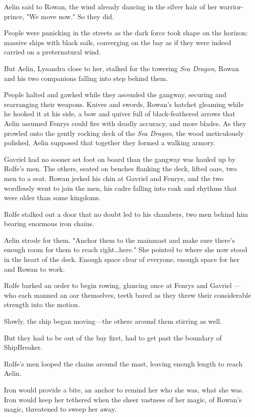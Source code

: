 Aelin said to Rowan, the wind already dancing in the silver hair of her warrior-prince, "We move now."
So they did.

People were panicking in the streets as the dark force took shape on the horizon: massive ships with black sails, converging on the bay as if they were indeed carried on a preternatural wind.

But Aelin, Lysandra close to her, stalked for the towering \emph{Sea Dragon}, Rowan and his two companions falling into step behind them.

People halted and gawked while they ascended the gangway, securing and rearranging their weapons.
Knives and swords, Rowan's hatchet gleaming while he hooked it at his side, a bow and quiver full of black-feathered arrows that Aelin assumed Fenrys could fire with deadly accuracy, and more blades.
As they prowled onto the gently rocking deck of the \emph{Sea Dragon}, the wood meticulously polished, Aelin supposed that together they formed a walking armory.

Gavriel had no sooner set foot on board than the gangway was hauled up by Rolfe's men.
The others, seated on benches flanking the deck, lifted oars, two men to a seat.
Rowan jerked his chin at Gavriel and Fenrys, and the two wordlessly went to join the men, his cadre falling into rank and rhythms that were older than some kingdoms.

Rolfe stalked out a door that no doubt led to his chambers, two men behind him bearing enormous iron chains.

Aelin strode for them.
"Anchor them to the mainmast and make sure there's enough room for them to reach right\ldots here."
She pointed to where she now stood in the heart of the deck.
Enough space clear of everyone, enough space for her and Rowan to work.

Rolfe barked an order to begin rowing, glancing once at Fenrys and Gavriel ---who each manned an oar themselves, teeth bared as they threw their considerable strength into the motion.

Slowly, the ship began moving---the others around them stirring as well.

But they had to be out of the bay first, had to get past the boundary of ShipBreaker.

Rolfe's men looped the chains around the mast, leaving enough length to reach Aelin.

Iron would provide a bite, an anchor to remind her who she was, what she was.
Iron would keep her tethered when the sheer vastness of her magic, of Rowan's magic, threatened to sweep her away.

